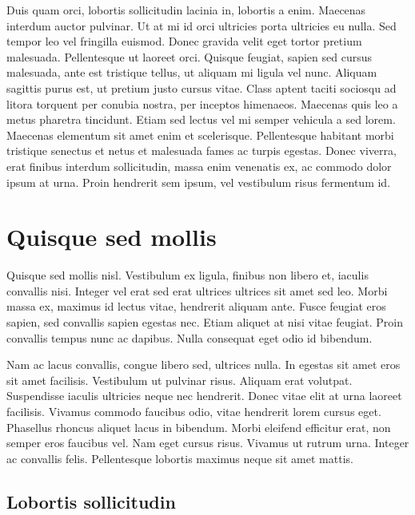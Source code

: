 \documentclass[a4paper,10pt]{report}
\begin{document}
Duis quam orci, lobortis sollicitudin lacinia in, lobortis a enim. Maecenas interdum auctor pulvinar.
Ut at mi id orci ultricies porta ultricies eu nulla. Sed tempor leo vel fringilla euismod. Donec gravida velit
eget tortor pretium malesuada. Pellentesque ut laoreet orci. Quisque feugiat, sapien sed cursus malesuada,
ante est tristique tellus, ut aliquam mi ligula vel nunc. Aliquam sagittis purus est, ut pretium justo cursus vitae.
Class aptent taciti sociosqu ad litora torquent per conubia nostra, per inceptos himenaeos.
Maecenas quis leo a metus pharetra tincidunt. Etiam sed lectus vel mi semper vehicula a sed lorem.
Maecenas elementum sit amet enim et scelerisque.
Pellentesque habitant morbi tristique senectus et netus et malesuada fames ac turpis egestas.
Donec viverra, erat finibus interdum sollicitudin, massa enim venenatis ex, ac commodo dolor ipsum at urna.
Proin hendrerit sem ipsum, vel vestibulum risus fermentum id.

\section{Quisque sed mollis}

Quisque sed mollis nisl. Vestibulum ex ligula, finibus non libero et, iaculis convallis nisi.
Integer vel erat sed erat ultrices ultrices sit amet sed leo. Morbi massa ex, maximus id lectus vitae,
hendrerit aliquam ante. Fusce feugiat eros sapien, sed convallis sapien egestas nec. Etiam aliquet at
nisi vitae feugiat. Proin convallis tempus nunc ac dapibus. Nulla consequat eget odio id bibendum.

Nam ac lacus convallis, congue libero sed, ultrices nulla. In egestas sit amet eros sit amet facilisis.
Vestibulum ut pulvinar risus. Aliquam erat volutpat. Suspendisse iaculis ultricies neque nec hendrerit.
Donec vitae elit at urna laoreet facilisis. Vivamus commodo faucibus odio, vitae hendrerit lorem cursus eget.
Phasellus rhoncus aliquet lacus in bibendum. Morbi eleifend efficitur erat, non semper eros faucibus vel.
Nam eget cursus risus. Vivamus ut rutrum urna. Integer ac convallis felis.
Pellentesque lobortis maximus neque sit amet mattis.

\subsection{Lobortis sollicitudin}
\end{document}
